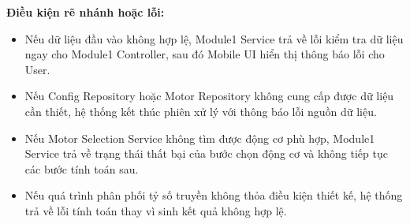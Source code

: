 \documentclass[a4paper]{article}
\begin{document}
\textbf{Điều kiện rẽ nhánh hoặc lỗi:}
\begin{itemize}
\item Nếu dữ liệu đầu vào không hợp lệ, Module1 Service trả về lỗi kiểm tra dữ liệu ngay cho Module1 Controller, sau đó Mobile UI hiển thị thông báo lỗi cho User.
\item Nếu Config Repository hoặc Motor Repository không cung cấp được dữ liệu cần thiết, hệ thống kết thúc phiên xử lý với thông báo lỗi nguồn dữ liệu.
\item Nếu Motor Selection Service không tìm được động cơ phù hợp, Module1 Service trả về trạng thái thất bại của bước chọn động cơ và không tiếp tục các bước tính toán sau.
\item Nếu quá trình phân phối tỷ số truyền không thỏa điều kiện thiết kế, hệ thống trả về lỗi tính toán thay vì sinh kết quả không hợp lệ.
\end{itemize}
\end{document}
